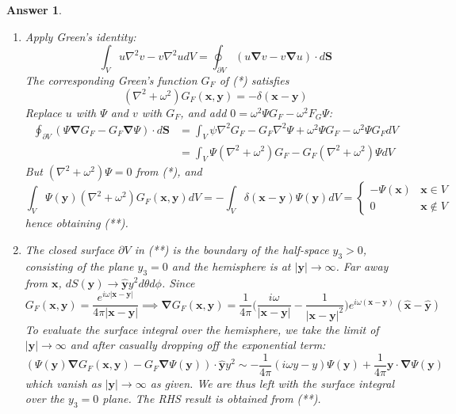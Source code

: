 \documentclass[a4paper]{article}
\newtheorem{ans}{Answer}[section]
\theoremstyle{new}
\begin{document}
\begin{ans}\leavevmode
\begin{enumerate}[label=(\roman*)]
\item Apply Green's identity:
$$\int_Vu\nabla^2v-v\nabla^2udV=\oint_{\partial V}(u\boldsymbol{\nabla}v-v\boldsymbol{\nabla}u)\cdot d\mathbf{S}$$
The corresponding Green's function $G_F$ of (*) satisfies
$$(\nabla^2+\omega^2)G_F(\mathbf{x},\mathbf{y})=-\delta(\mathbf{x}-\mathbf{y})$$
Replace $u$ with $\Psi$ and $v$ with $G_F$, and add $0=\omega^2\Psi G_F-\omega^2F_G\Psi$:
\begin{align}
\oint_{\partial V}(\Psi\boldsymbol{\nabla}G_F-G_F\boldsymbol{\nabla}\Psi)\cdot d\mathbf{S}&=\int_V\psi\nabla^2G_F-G_F\nabla^2\Psi+\omega^2\Psi G_F-\omega^2\Psi G_FdV\nonumber\\&=\int_V\Psi(\nabla^2+\omega^2)G_F-G_F(\nabla^2+\omega^2)\Psi dV\nonumber
\end{align}
But $(\nabla^2+\omega^2)\Psi=0$ from (*), and 
\begin{equation}
    \int_V\Psi(\mathbf{y})(\nabla^2+\omega^2)G_F(\mathbf{x},\mathbf{y})dV=-\int_V\delta(\mathbf{x}-\mathbf{y})\Psi(\mathbf{y})dV=
\left\{
        \begin{array}{ll}
      -\Psi(\mathbf{x}) & \mathbf{x}\in V \\
      0 & \mathbf{x}\notin V
        \end{array}
    \right.\nonumber
\end{equation}
hence obtaining (**).
\item The closed surface $\partial V$ in (**) is the boundary of the half-space $y_3>0$, consisting of the plane $y_3=0$ and the hemisphere is at $|\mathbf{y}|\rightarrow\infty$. Far away from $\mathbf{x}$, $dS(\mathbf{y})\rightarrow\mathbf{\hat{y}}y^2d\theta d\phi$. Since $$G_F(\mathbf{x},\mathbf{y})=\frac{e^{i\omega|\mathbf{x}-\mathbf{y}|}}{4\pi|\mathbf{x}-\mathbf{y}|}\implies\boldsymbol{\nabla}G_F(\mathbf{x},\mathbf{y})=\frac{1}{4\pi}\bigg(\frac{i\omega}{|\mathbf{x}-\mathbf{y}|}-\frac{1}{|\mathbf{x}-\mathbf{y}|^2}\bigg)e^{i\omega(\mathbf{x}-\mathbf{y})}(\mathbf{\hat{x}}-\mathbf{\hat{y}})$$
To evaluate the surface integral over the hemisphere, we take the limit of $|\mathbf{y}|\rightarrow\infty$ and after casually dropping off the exponential term: 
$$(\Psi(\mathbf{y})\boldsymbol{\nabla}G_F(\mathbf{x},\mathbf{y})-G_F\boldsymbol{\nabla}\Psi(\mathbf{y}))\cdot\mathbf{\hat{y}}y^2\sim-\frac{1}{4\pi}(i\omega y-y)\Psi(\mathbf{y})+\frac{1}{4\pi}\mathbf{y}\cdot\boldsymbol{\nabla}\Psi(\mathbf{y})$$
which vanish as $|\mathbf{y}|\rightarrow\infty$ as given. We are thus left with the surface integral over the $y_3=0$ plane. The RHS result is obtained from (**).

\end{enumerate}
\end{ans}
\end{document}
